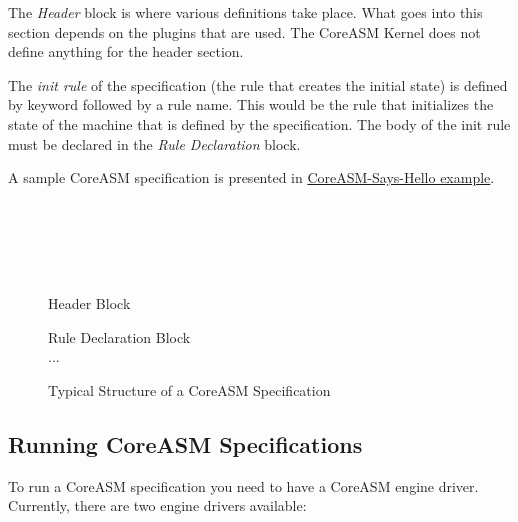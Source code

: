 \documentclass{article}
\newcommand{\CoreASM}{{\sffamily CoreASM}\xspace}
\begin{document}
The \emph{Header} block is where various definitions take place. What goes into this  
section depends on the plugins that are used. The \CoreASM Kernel 
does not define anything for the header section. 

The \emph{init rule} of the specification (the rule
that creates the initial state) is defined by keyword 
 followed
by a rule name. This would be the rule that initializes the state of the machine
that is defined by the specification. The body of the init rule must be declared
in the \emph{Rule Declaration} block.

A sample \CoreASM specification is presented in \hyperref[spec:thisiscoreasm]{CoreASM-Says-Hello example}.

\begin{figure}
\begin{center}
\begin{minipage}{0.65\textwidth}
\begin{tcolorbox}
\small
{}\\\\
\\
\\
	\begin{tcolorbox}
	\sf Header Block
	\end{tcolorbox}
	\vspace{1em}
	\asm{init InitRuleName}
	\vspace{1em}
	\begin{tcolorbox}
	\sf Rule Declaration Block\\
	...
	\vspace{1em}
	\end{tcolorbox}
\end{tcolorbox}
\end{minipage}
\end{center}
\caption{Typical Structure of a \CoreASM Specification}
\label{fig:specStructure}
\end{figure}
\subsection{Running \CoreASM Specifications}
\label{running}

To run a \CoreASM specification you need to have a \CoreASM engine driver. Currently, there are
two engine drivers available:
\end{document}
